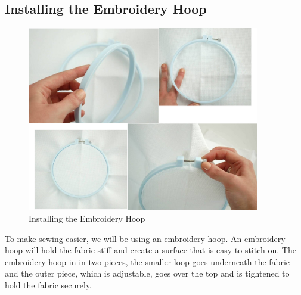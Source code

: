 \documentclass[letterpaper,twoside,12pt]{article}
\begin{document}
\subsection{Installing the Embroidery Hoop}
\begin{figure}[hbpt]\begin{centering}%
\includegraphics[width=4in]{InstallEmbroideryHoop.jpg}
\caption{Installing the Embroidery Hoop}
\label{fig:installembroideryhoop}
\end{centering}\end{figure}
To make sewing easier, we will be using an embroidery hoop.  An embroidery 
hoop will hold the fabric stiff and create a surface that is easy to stitch
on.  The embroidery hoop in in two pieces, the smaller loop goes underneath 
the fabric and the outer piece, which is adjustable, goes over the top and is 
tightened to hold the fabric securely.
\end{document}

